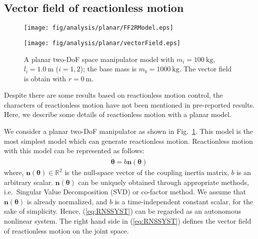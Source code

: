 \documentclass[preprint,12pt]{elsarticle}
\def\fig#1{{Fig.~\ref{fig:#1}}}
\def\eq#1{{(\ref{eq:#1})}}
\def\R#1{{\in\mathbb{R}^{#1}}}
\def\thd{{\dot{\bbm{\theta}}}}
\def\th{{\bbm{\theta}}}
\def\unit#1{{~\mathrm{#1}}}
\def\bbm#1{\bm{#1}}
\begin{document}
\subsection{Vector field of reactionless motion}
\label{sec:ANALYSIS_FIXED}
%
\begin{figure}[t]
  \centering
  \begin{minipage}[t]{0.36\linewidth}
    \centering
    \texttt{[image: fig/analysis/planar/FF2RModel.eps]}
  \end{minipage}
  \hspace{4mm}
  \begin{minipage}[t]{0.30\linewidth}
    \centering
    \texttt{[image: fig/analysis/planar/vectorField.eps]}
  \end{minipage}
  \caption{A planar two-DoF space manipulator model with $m_{i} = 100\unit{kg}$,
  $l_{i} = 1.0\unit{m}$ ($i = 1, 2$); the base mass is $m_{b} = 1000\unit{kg}$.
  The vector field is obtain with $r = 0\unit{m}$.}
  \label{fig:FF2R}
\end{figure}
%
Despite there are some results based on reactionless motion control,
the characters of reactionless motion have not been mentioned in pre-reported results.
Here, we describe some details of reactionless motion with a planar model.

We consider a planar two-DoF manipulator as shown in \fig{FF2R}.
This model is the most simplest model which can generate reactionless motion.
Reactionless motion with this model can be represented as follows:
%
\begin{align}
  \thd = b\bm{n}(\th)\label{eq:RNSSYST}
\end{align}
%
where, $\bm{n}(\th)\R{2}$ is the null-space vector of the coupling inertia matrix,
$b$ is an arbitrary scalar.
$\bm{n}(\th)$ can be uniquely obtained through appropriate methods,
i.e.\ Singular Value Decomposition (SVD) or co-factor method.
We assume that $\bm{n}(\th)$ is already normalized,
and $b$ is a time-independent constant scalar, for the sake of simplicity.
Hence, \eq{RNSSYST} can be regarded as an autonomous nonlinear system.
The right hand side in \eq{RNSSYST} defines the vector field of reactionless motion
on the joint space.
\end{document}
